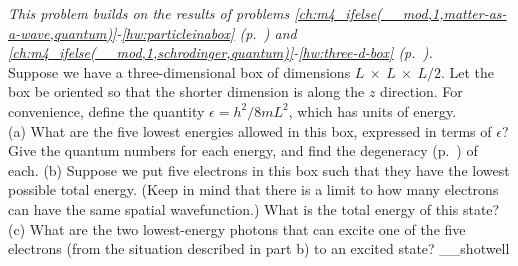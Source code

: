 \emph{This problem builds on the results of problems \ref{ch:m4_ifelse(__mod,1,matter-as-a-wave,quantum)}-\ref{hw:particleinabox}
(p.~\pageref{hw:particleinabox}) and \ref{ch:m4_ifelse(__mod,1,schrodinger,quantum)}-\ref{hw:three-d-box}
(p.~\pageref{hw:three-d-box}).}\\
Suppose we have a three-dimensional box of dimensions $L\ \times\ L\ \times\ L/2$.
Let the box be oriented so that the shorter dimension is along the $z$ direction.
For convenience, define the quantity $\epsilon=h^2/8mL^2$, which has units of energy.\\
(a) What are the five lowest energies allowed in this box, expressed in terms of
$\epsilon$? Give the quantum numbers for each energy,
and find the degeneracy (p.~\pageref{m4_ifelse(__mod,quantum-degeneracy,subsubsec:degeneracy)}) of each.\hwendpart
(b) Suppose we put five electrons in this box such that they have the lowest
possible total energy. (Keep in
mind that there is a limit to how many electrons can have the same spatial wavefunction.) What is the
total energy of this state?\answercheck\hwendpart
(c) What are the two lowest-energy photons that can excite one of the five electrons (from the situation
described in part b) to an excited state?\answercheck\hwendpart
__shotwell

